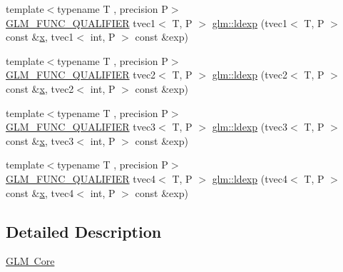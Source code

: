 \begin{DoxyCompactItemize}
\item 
{\footnotesize template$<$typename T , precision P$>$ }\\\mbox{\hyperlink{setup_8hpp_a33fdea6f91c5f834105f7415e2a64407}{G\+L\+M\+\_\+\+F\+U\+N\+C\+\_\+\+Q\+U\+A\+L\+I\+F\+I\+ER}} tvec1$<$ T, P $>$ \mbox{\hyperlink{namespaceglm_aede23b4113d6d562c9290312af546ffc}{glm\+::ldexp}} (tvec1$<$ T, P $>$ const \&\mbox{\hyperlink{glad_8h_a92d0386e5c19fb81ea88c9f99644ab1d}{x}}, tvec1$<$ int, P $>$ const \&exp)
\item 
{\footnotesize template$<$typename T , precision P$>$ }\\\mbox{\hyperlink{setup_8hpp_a33fdea6f91c5f834105f7415e2a64407}{G\+L\+M\+\_\+\+F\+U\+N\+C\+\_\+\+Q\+U\+A\+L\+I\+F\+I\+ER}} tvec2$<$ T, P $>$ \mbox{\hyperlink{namespaceglm_aaa95b8049903d4a4d7af619c0368a624}{glm\+::ldexp}} (tvec2$<$ T, P $>$ const \&\mbox{\hyperlink{glad_8h_a92d0386e5c19fb81ea88c9f99644ab1d}{x}}, tvec2$<$ int, P $>$ const \&exp)
\item 
{\footnotesize template$<$typename T , precision P$>$ }\\\mbox{\hyperlink{setup_8hpp_a33fdea6f91c5f834105f7415e2a64407}{G\+L\+M\+\_\+\+F\+U\+N\+C\+\_\+\+Q\+U\+A\+L\+I\+F\+I\+ER}} tvec3$<$ T, P $>$ \mbox{\hyperlink{namespaceglm_a991d1c012aefb805ddd6bb97c001553c}{glm\+::ldexp}} (tvec3$<$ T, P $>$ const \&\mbox{\hyperlink{glad_8h_a92d0386e5c19fb81ea88c9f99644ab1d}{x}}, tvec3$<$ int, P $>$ const \&exp)
\item 
{\footnotesize template$<$typename T , precision P$>$ }\\\mbox{\hyperlink{setup_8hpp_a33fdea6f91c5f834105f7415e2a64407}{G\+L\+M\+\_\+\+F\+U\+N\+C\+\_\+\+Q\+U\+A\+L\+I\+F\+I\+ER}} tvec4$<$ T, P $>$ \mbox{\hyperlink{namespaceglm_a50fbbebff2e110062eafca8839cb5d37}{glm\+::ldexp}} (tvec4$<$ T, P $>$ const \&\mbox{\hyperlink{glad_8h_a92d0386e5c19fb81ea88c9f99644ab1d}{x}}, tvec4$<$ int, P $>$ const \&exp)
\end{DoxyCompactItemize}


\subsection{Detailed Description}
\mbox{\hyperlink{group__core}{G\+LM Core}} 